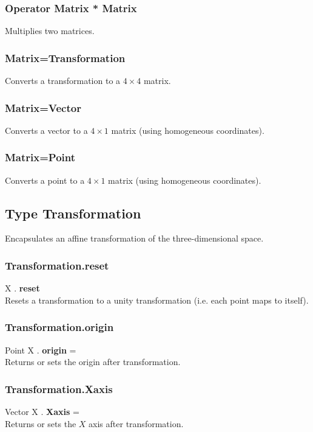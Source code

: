 \subsubsection{Operator Matrix * Matrix \label{O:Matrix*Matrix}}
Multiplies two matrices.

\subsubsection{Matrix=Transformation \label{C:Matrix=Transformation}}
Converts a transformation to a $4 \times 4$ matrix.

\subsubsection{Matrix=Vector \label{C:Matrix=Vector}}
Converts a vector to a $4 \times 1$ matrix (using homogeneous coordinates).

\subsubsection{Matrix=Point \label{C:Matrix=Point}}
Converts a point to a $4 \times 1$ matrix (using homogeneous coordinates).


\subsection{Type Transformation \label{T:Transformation}}
Encapsulates an affine transformation of the three-dimensional space.

\subsubsection{Transformation.reset \label{F:Transformation:reset}}
X . \textbf{reset} \\
Resets a transformation to a unity transformation (i.e. each point maps to itself).

\subsubsection{Transformation.origin \label{F:Transformation:origin}}
Point X . \textbf{origin} = \\
Returns or sets the origin after transformation.

\subsubsection{Transformation.Xaxis \label{F:Transformation:Xaxis}}
Vector X . \textbf{Xaxis} = \\
Returns or sets the $X$ axis after transformation.

